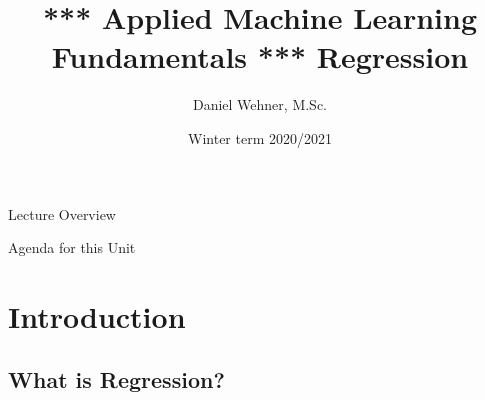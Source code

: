 


\title[Regression]{*** Applied Machine Learning Fundamentals *** Regression}
\author{Daniel Wehner, M.Sc.}
\date{Winter term 2020/2021}




\maketitlepage


\begin{frame}{Lecture Overview}{}
\end{frame}


\begin{frame}{Agenda for this Unit}
	\begin{multicols}{2}
		\tableofcontents
	\end{multicols}
\end{frame}


\section{Introduction}

\subsection{What is Regression?}


